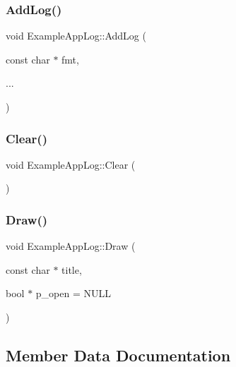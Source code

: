 \subsubsection{\texorpdfstring{Add\+Log()}{AddLog()}}
{\footnotesize\ttfamily void Example\+App\+Log\+::\+Add\+Log (\begin{DoxyParamCaption}\item[{const char $\ast$}]{fmt,  }\item[{}]{... }\end{DoxyParamCaption})}

\hypertarget{struct_example_app_log_ab9c298defddbb106fdfe4ab16c5eebac}{}\label{struct_example_app_log_ab9c298defddbb106fdfe4ab16c5eebac} 
\subsubsection{\texorpdfstring{Clear()}{Clear()}}
{\footnotesize\ttfamily void Example\+App\+Log\+::\+Clear (\begin{DoxyParamCaption}{ }\end{DoxyParamCaption})}

\hypertarget{struct_example_app_log_a5ad3a4bdb89171b84aeaff96948a1f77}{}\label{struct_example_app_log_a5ad3a4bdb89171b84aeaff96948a1f77} 
\subsubsection{\texorpdfstring{Draw()}{Draw()}}
{\footnotesize\ttfamily void Example\+App\+Log\+::\+Draw (\begin{DoxyParamCaption}\item[{const char $\ast$}]{title,  }\item[{bool $\ast$}]{p\+\_\+open = {\ttfamily NULL} }\end{DoxyParamCaption})}



\subsection{Member Data Documentation}
\hypertarget{struct_example_app_log_a74fb7cd7bd8c2507b41331ebb7d0e56d}{}\label{struct_example_app_log_a74fb7cd7bd8c2507b41331ebb7d0e56d} 
